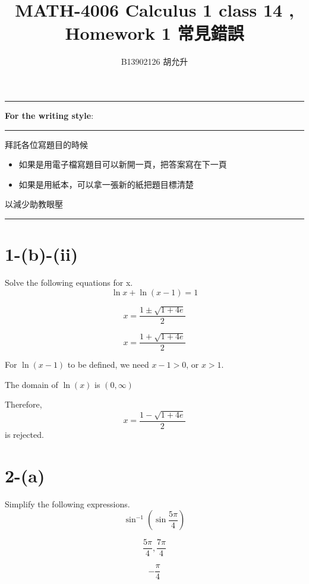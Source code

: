 \documentclass{article}
\title{MATH-4006 Calculus 1 class 14 , Homework 1 常見錯誤}
\author{B13902126 胡允升}
\date{}
\begin{document}
\fontsize{12pt}{16pt}\selectfont

\maketitle  
\noindent\rule{\linewidth}{0.4pt}
\textbf{For the writing style}:

\noindent\rule{\linewidth}{0.4pt}
拜託各位寫題目的時候
\begin{itemize}
    \item 如果是用電子檔寫題目可以新開一頁，把答案寫在下一頁
    \item 如果是用紙本，可以拿一張新的紙把題目標清楚
\end{itemize}
以減少助教眼壓

\noindent\rule{\linewidth}{0.4pt}

\section{1-(b)-(ii)}

\begin{problem}
Solve the following equations for x.
\[
\ln x + \ln(x - 1) = 1
\]
\end{problem}
\vspace{-12pt}
\begin{wrong}
\[
x = \frac{1 \pm \sqrt{1 + 4e}}{2}
\]
\end{wrong}
\vspace{-12pt}
\begin{cor}
\[
x = \frac{1 + \sqrt{1 + 4e}}{2}
\]
\end{cor}

\begin{reason}
For $\ln(x-1)$ to be defined, we need $x-1 > 0$, or $x > 1$.

\begin{note}
The domain of $\ln(x)$ is $(0,\infty)$
\end{note}
\vspace{0.5em}


Therefore, \[
 x = \frac{1 - \sqrt{1 + 4e}}{2}
\]
is rejected.

\end{reason}

\newpage

\section{2-(a)}

\begin{problem}
Simplify the following expressions.
\[
\sin^{-1}\left(\sin\frac{5\pi}{4}\right)
\]
\end{problem}
\vspace{-12pt}
\begin{wrong}
\[
\frac{5\pi}{4}, \frac{7\pi}{4}
\]
\end{wrong}
\vspace{-12pt}
\begin{cor}
\[
    -\frac{\pi}{4}
\]
\end{cor}
\end{document}
